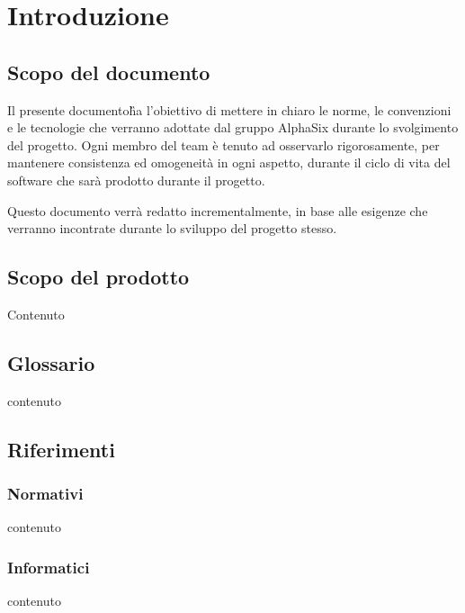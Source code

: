 \section{Introduzione}

\subsection{Scopo del documento}
    Il presente documento\G ha l’obiettivo di mettere in chiaro le norme, le convenzioni e le tecnologie
    che verranno adottate dal gruppo AlphaSix durante lo svolgimento del progetto\GAlt. Ogni membro del team
    \`e tenuto ad osservarlo rigorosamente, per mantenere consistenza ed omogeneit\`a in ogni aspetto, durante il ciclo di
    vita del software che sarà prodotto durante il progetto. \par
    Questo documento verr\`a redatto incrementalmente, in base alle esigenze che verranno incontrate durante lo sviluppo del
    progetto stesso.

\subsection{Scopo del prodotto}
    
    Contenuto

\subsection{Glossario}
    contenuto

\subsection{Riferimenti}

    \subsubsection{Normativi}
        contenuto

    \subsubsection{Informatici}
        contenuto
